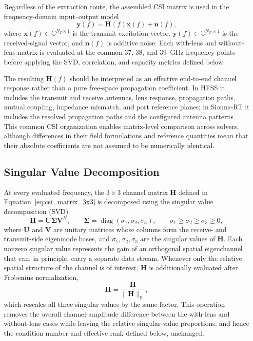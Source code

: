 Regardless of the extraction route, the assembled CSI matrix is used in the frequency-domain input--output model
\begin{equation}
    \mathbf{y}(f)=\mathbf{H}(f)\mathbf{x}(f)+\mathbf{n}(f),
    \label{eq:mimo_frequency_domain}
\end{equation}
where $\mathbf{x}(f)\in\mathbb{C}^{N_T\times1}$ is the transmit excitation vector, $\mathbf{y}(f)\in\mathbb{C}^{N_R\times1}$ is the received-signal vector, and $\mathbf{n}(f)$ is additive noise. Each with-lens and without-lens matrix is evaluated at the common 37, 38, and 39~GHz frequency points before applying the SVD, correlation, and capacity metrics defined below.

The resulting $\mathbf{H}(f)$ should be interpreted as an effective end-to-end channel response rather than a pure free-space propagation coefficient. In HFSS it includes the transmit and receive antennas, lens response, propagation paths, mutual coupling, impedance mismatch, and port reference planes; in Sionna-RT it includes the resolved propagation paths and the configured antenna patterns. This common CSI organization enables matrix-level comparison across solvers, although differences in their field formulations and reference quantities mean that their absolute coefficients are not assumed to be numerically identical.

\subsection{Singular Value Decomposition}
At every evaluated frequency, the $3\times3$ channel matrix $\mathbf{H}$ defined in Equation~\ref{eq:csi_matrix_3x3} is decomposed using the singular value decomposition (SVD)
\begin{equation}
    \mathbf{H} = \mathbf{U}\boldsymbol{\Sigma}\mathbf{V}^{H},
    \qquad
    \boldsymbol{\Sigma} = \operatorname{diag}(\sigma_1,\sigma_2,\sigma_3),
    \qquad
    \sigma_1\geq\sigma_2\geq\sigma_3\geq0,
    \label{eq:mimo_svd}
\end{equation}
where $\mathbf{U}$ and $\mathbf{V}$ are unitary matrices whose columns form the receive- and transmit-side eigenmode bases, and $\sigma_1,\sigma_2,\sigma_3$ are the singular values of $\mathbf{H}$. Each nonzero singular value represents the gain of an orthogonal spatial eigenchannel that can, in principle, carry a separate data stream. Whenever only the relative spatial structure of the channel is of interest, $\mathbf{H}$ is additionally evaluated after Frobenius normalization,
\begin{equation}
    \widetilde{\mathbf{H}} = \frac{\mathbf{H}}{\lVert\mathbf{H}\rVert_{\mathrm{F}}},
    \label{eq:mimo_frobenius_normalization}
\end{equation}
which rescales all three singular values by the same factor. This operation removes the overall channel-amplitude difference between the with-lens and without-lens cases while leaving the relative singular-value proportions, and hence the condition number and effective rank defined below, unchanged.

